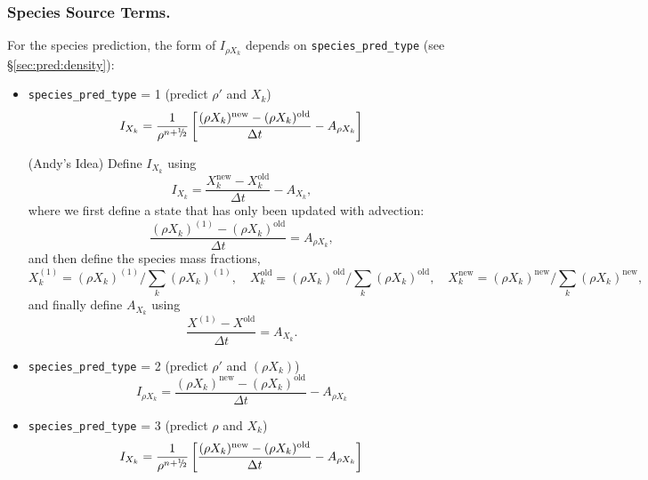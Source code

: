 \subsubsection{Species Source Terms.}
For the species prediction, the form of $I_{\rho X_k}$ depends on
{\tt species\_pred\_type} (see \S \ref{sec:pred:density}):  
\begin{itemize}
\item {\tt species\_pred\_type} = 1 (predict $\rho'$ and $X_k$)
%
\begin{equation}
I_{X_k} = \frac{1}{\rho^{n+\myhalf}} \left [ 
      \frac{(\rho X_k)^\mathrm{new} - 
            (\rho X_k)^\mathrm{old}}{\Delta t} - A_{\rho X_k}  \right ]
\end{equation}

(Andy's Idea) Define $I_{X_k}$ using
\begin{equation}
I_{X_k} = \frac{X_k^\mathrm{new} - X_k^\mathrm{old}}{\Delta t} - A_{X_k},
\end{equation}
where we first define a state that has only been updated with advection:
\begin{equation}
\frac{(\rho X_k)^{(1)} - (\rho X_k)^\mathrm{old}}{\Delta t} = A_{\rho X_k},
\end{equation}
and then define the species mass fractions,
\begin{equation}
X_k^{(1)} = (\rho X_k)^{(1)} / \sum_k (\rho X_k)^{(1)}, \quad 
X_k^\mathrm{old} = (\rho X_k)^\mathrm{old} / \sum_k (\rho X_k)^\mathrm{old}, \quad 
X_k^\mathrm{new} = (\rho X_k)^\mathrm{new} / \sum_k (\rho X_k)^\mathrm{new},
\end{equation}
and finally define $A_{X_k}$ using
\begin{equation}
\frac{X^{(1)} - X^\mathrm{old}}{\Delta t}= A_{X_k}.
\end{equation}

\item {\tt species\_pred\_type} = 2 (predict $\rho'$ and $(\rho X_k)$)
%
\begin{equation}
I_{\rho X_k} = \frac{(\rho X_k)^\mathrm{new} - (\rho X_k)^\mathrm{old}}{\Delta t} - A_{\rho X_k} 
\label{eq:sdc:Irhoo}
\end{equation}

\item {\tt species\_pred\_type} = 3 (predict $\rho$ and $X_k$)
%
\begin{equation}
I_{X_k} = \frac{1}{\rho^{n+\myhalf}} \left [ 
      \frac{(\rho X_k)^\mathrm{new} - 
            (\rho X_k)^\mathrm{old}}{\Delta t} - A_{\rho X_k}  \right ]
\end{equation}

\end{itemize}

